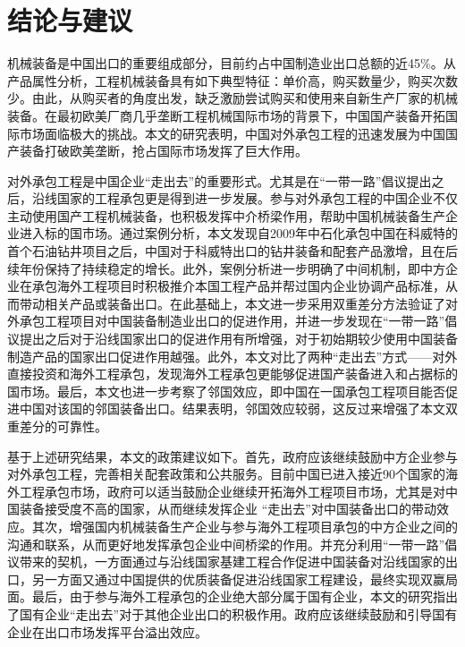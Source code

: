 \documentclass[a4paper,12pt]{article}
\begin{document}
\section{结论与建议}
机械装备是中国出口的重要组成部分，目前约占中国制造业出口总额的近45\%。从产品属性分析，工程机械装备具有如下典型特征：单价高，购买数量少，购买次数少。由此，从购买者的角度出发，缺乏激励尝试购买和使用来自新生产厂家的机械装备。在最初欧美厂商几乎垄断工程机械国际市场的背景下，中国国产装备开拓国际市场面临极大的挑战。本文的研究表明，中国对外承包工程的迅速发展为中国国产装备打破欧美垄断，抢占国际市场发挥了巨大作用。

\vspace{0.5em}  %

对外承包工程是中国企业“走出去”的重要形式。尤其是在“一带一路”倡议提出之后，沿线国家的工程承包更是得到进一步发展。参与对外承包工程的中国企业不仅主动使用国产工程机械装备，也积极发挥中介桥梁作用，帮助中国机械装备生产企业进入标的国市场。通过案例分析，本文发现自2009年中石化承包中国在科威特的首个石油钻井项目之后，中国对于科威特出口的钻井装备和配套产品激增，且在后续年份保持了持续稳定的增长。此外，案例分析进一步明确了中间机制，即中方企业在承包海外工程项目时积极推介本国工程产品并帮过国内企业协调产品标准，从而带动相关产品或装备出口。在此基础上，本文进一步采用双重差分方法验证了对外承包工程项目对中国装备制造业出口的促进作用，并进一步发现在“一带一路”倡议提出之后对于沿线国家出口的促进作用有所增强，对于初始期较少使用中国装备制造产品的国家出口促进作用越强。此外，本文对比了两种“走出去”方式——对外直接投资和海外工程承包，发现海外工程承包更能够促进国产装备进入和占据标的国市场。最后，本文也进一步考察了邻国效应，即中国在一国承包工程项目能否促进中国对该国的邻国装备出口。结果表明，邻国效应较弱，这反过来增强了本文双重差分的可靠性。

\vspace{0.5em}  %

基于上述研究结果，本文的政策建议如下。首先，政府应该继续鼓励中方企业参与对外承包工程，完善相关配套政策和公共服务。目前中国已进入接近90个国家的海外工程承包市场，政府可以适当鼓励企业继续开拓海外工程项目市场，尤其是对中国装备接受度不高的国家，从而继续发挥企业 “走出去”对中国装备出口的带动效应。其次，增强国内机械装备生产企业与参与海外工程项目承包的中方企业之间的沟通和联系，从而更好地发挥承包企业中间桥梁的作用。并充分利用“一带一路”倡议带来的契机，一方面通过与沿线国家基建工程合作促进中国装备对沿线国家的出口，另一方面又通过中国提供的优质装备促进沿线国家工程建设，最终实现双赢局面。最后，由于参与海外工程承包的企业绝大部分属于国有企业，本文的研究指出了国有企业“走出去”对于其他企业出口的积极作用。政府应该继续鼓励和引导国有企业在出口市场发挥平台溢出效应。
\end{document}
